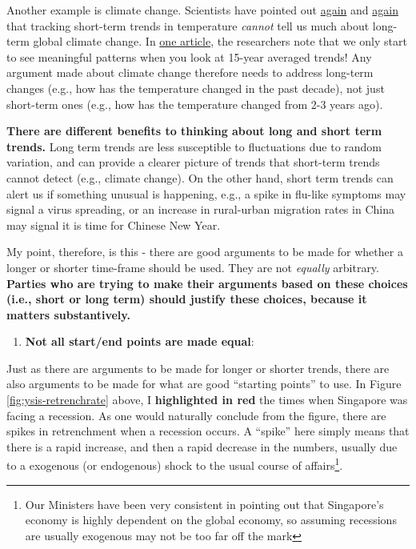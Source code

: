 \documentclass[openany]{book}
\providecommand{\tightlist}{%
  \setlength{\itemsep}{0pt}\setlength{\parskip}{0pt}}
\let\rmarkdownfootnote\footnote%
\def\footnote{\protect\rmarkdownfootnote}
\begin{document}
Another example is climate change. Scientists have pointed out
\href{https://www.huffpost.com/entry/nate-silver-climate-change_b_1909482}{again}
and
\href{http://www.realclimate.org/index.php/archives/2008/01/uncertainty-noise-and-the-art-of-model-data-comparison/}{again}
that tracking short-term trends in temperature \emph{cannot} tell us
much about long-term global climate change. In
\href{http://www.realclimate.org/index.php/archives/2008/01/uncertainty-noise-and-the-art-of-model-data-comparison/}{one
article}, the researchers note that we only start to see meaningful
patterns when you look at 15-year averaged trends! Any argument made
about climate change therefore needs to address long-term changes (e.g.,
how has the temperature changed in the past decade), not just short-term
ones (e.g., how has the temperature changed from 2-3 years ago).

\textbf{There are different benefits to thinking about long and short
term trends.} Long term trends are less susceptible to fluctuations due
to random variation, and can provide a clearer picture of trends that
short-term trends cannot detect (e.g., climate change). On the other
hand, short term trends can alert us if something unusual is happening,
e.g., a spike in flu-like symptoms may signal a virus spreading, or an
increase in rural-urban migration rates in China may signal it is time
for Chinese New Year.

My point, therefore, is this - there are good arguments to be made for
whether a longer or shorter time-frame should be used. They are not
\emph{equally} arbitrary. \textbf{Parties who are trying to make their
arguments based on these choices (i.e., short or long term) should
justify these choices, because it matters substantively.}

\begin{enumerate}
\def\labelenumi{\arabic{enumi}.}
\setcounter{enumi}{1}
\tightlist
\item
  \textbf{Not all start/end points are made equal}:
\end{enumerate}

Just as there are arguments to be made for longer or shorter trends,
there are also arguments to be made for what are good ``starting
points'' to use. In Figure \ref{fig:ysis-retrenchrate} above, I
\textbf{highlighted in red} the times when Singapore was facing a
recession. As one would naturally conclude from the figure, there are
spikes in retrenchment when a recession occurs. A ``spike'' here simply
means that there is a rapid increase, and then a rapid decrease in the
numbers, usually due to a exogenous (or endogenous) shock to the usual
course of affairs\footnote{Our Ministers have been very consistent in
  pointing out that Singapore's economy is highly dependent on the
  global economy, so assuming recessions are usually exogenous may not
  be too far off the mark}.
\end{document}
